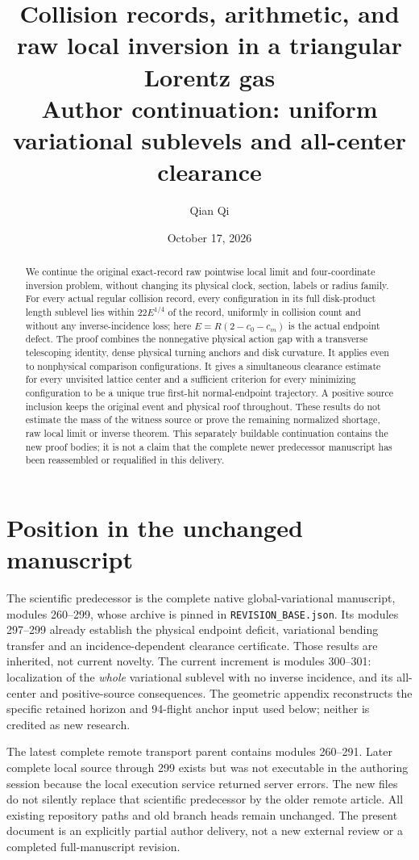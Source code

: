 \documentclass[11pt]{amsart}
\title[Collision records: sublevel clearance continuation]{Collision records, arithmetic, and raw local inversion in a triangular Lorentz gas\\[6pt]\large Author continuation: uniform variational sublevels and all-center clearance}
\author{Qian Qi}
\date{October 17, 2026}
\begin{document}
\begin{abstract}
We continue the original exact-record raw pointwise local limit and four-coordinate inversion problem, without changing its physical clock, section, labels or radius family. For every actual regular collision record, every configuration in its full disk-product length sublevel lies within $22E^{1/4}$ of the record, uniformly in collision count and without any inverse-incidence loss; here $E=R(2-c_0-c_m)$ is the actual endpoint defect. The proof combines the nonnegative physical action gap with a transverse telescoping identity, dense physical turning anchors and disk curvature. It applies even to nonphysical comparison configurations. It gives a simultaneous clearance estimate for every unvisited lattice center and a sufficient criterion for every minimizing configuration to be a unique true first-hit normal-endpoint trajectory. A positive source inclusion keeps the original event and physical roof throughout. These results do not estimate the mass of the witness source or prove the remaining normalized shortage, raw local limit or inverse theorem. This separately buildable continuation contains the new proof bodies; it is not a claim that the complete newer predecessor manuscript has been reassembled or requalified in this delivery.
\end{abstract}
\maketitle
\section*{Position in the unchanged manuscript}
The scientific predecessor is the complete native global-variational manuscript, modules 260--299, whose archive is pinned in \texttt{REVISION\_BASE.json}. Its modules 297--299 already establish the physical endpoint deficit, variational bending transfer and an incidence-dependent clearance certificate. Those results are inherited, not current novelty. The current increment is modules 300--301: localization of the \emph{whole} variational sublevel with no inverse incidence, and its all-center and positive-source consequences. The geometric appendix reconstructs the specific retained horizon and 94-flight anchor input used below; neither is credited as new research.

The latest complete remote transport parent contains modules 260--291. Later complete local source through 299 exists but was not executable in the authoring session because the local execution service returned server errors. The new files do not silently replace that scientific predecessor by the older remote article. All existing repository paths and old branch heads remain unchanged. The present document is an explicitly partial author delivery, not a new external review or a completed full-manuscript revision.
\end{document}
